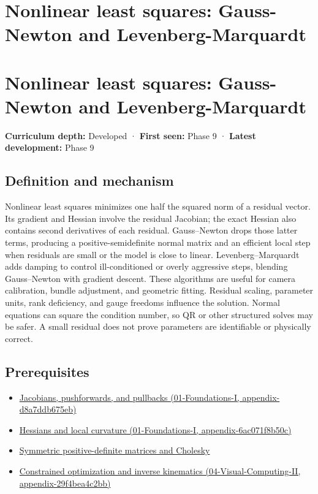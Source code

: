 \hypertarget{appendix-2c2df8345991}{}
\section*{Nonlinear least squares: Gauss-Newton and Levenberg-Marquardt}
\section{Nonlinear least squares: Gauss-Newton and Levenberg-Marquardt}\label{nonlinear-least-squares-gauss-newton-and-levenberg-marquardt}

\textbf{Curriculum depth:} Developed · \textbf{First seen:} Phase 9 · \textbf{Latest development:} Phase 9

\subsection{Definition and mechanism}\label{definition-and-mechanism}

Nonlinear least squares minimizes one half the squared norm of a residual vector. Its gradient and Hessian involve the residual Jacobian; the exact Hessian also contains second derivatives of each residual. Gauss--Newton drops those latter terms, producing a positive-semidefinite normal matrix and an efficient local step when residuals are small or the model is close to linear. Levenberg--Marquardt adds damping to control ill-conditioned or overly aggressive steps, blending Gauss--Newton with gradient descent. These algorithms are useful for camera calibration, bundle adjustment, and geometric fitting. Residual scaling, parameter units, rank deficiency, and gauge freedoms influence the solution. Normal equations can square the condition number, so QR or other structured solves may be safer. A small residual does not prove parameters are identifiable or physically correct.

\subsection{Prerequisites}\label{prerequisites}

\begin{itemize}
\tightlist
\item
  \href{}{Jacobians, pushforwards, and pullbacks (01-Foundations-I, appendix-d8a7ddb675eb)}
\item
  \href{}{Hessians and local curvature (01-Foundations-I, appendix-6ac071f8b50c)}
\item
  \hyperref[appendix-50d2ea3c9b26]{Symmetric positive-definite matrices and Cholesky}
\item
  \href{}{Constrained optimization and inverse kinematics (04-Visual-Computing-II, appendix-29f4bea4c2bb)}
\end{itemize}


